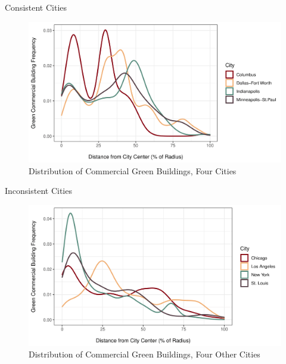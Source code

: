 \documentclass[11pt]{beamer}
\begin{document}
\begin{frame}{Consistent Cities}

\begin{figure}
\caption{Distribution of Commercial Green Buildings, Four Cities}
\centering
\includegraphics[width=\textwidth]{goodCities-1.png}
\end{figure}

\end{frame}


\begin{frame}{Inconsistent Cities}

\begin{figure}
\caption{Distribution of Commercial Green Buildings, Four Other Cities}
\centering
\includegraphics[width=\textwidth]{badCities-1.png}
\end{figure}

\end{frame}


\end{document}
